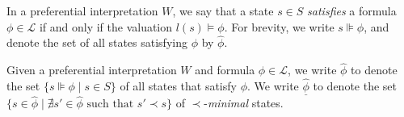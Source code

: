 \begin{definition}
  \label{definition:state-satisfaction} In a preferential interpretation $W$, we say that a state $s \in S$ \emph{satisfies} a formula $\phi
  \in \mathcal{L}$ if and only if the valuation $l(s) \vDash \phi$. For brevity, we write $s \VDash \phi$, and denote the set of all states
  satisfying $\phi$ by $\hat{\phi}$.
\end{definition}

\begin{definition}
  \label{definition:state-minimal} Given a preferential interpretation $W$ and formula $\phi \in \mathcal{L}$, we write $\hat{\phi}$ to
  denote the set $\{s \VDash \phi \mid s \in S\}$ of all states that satisfy $\phi$. We write $\underline{\hat{\phi}}$ to denote the set $\{s
  \in \hat{\phi}\mid \nexists s' \in \hat{\phi}\text{ such that }s' \prec s \}$ of $\prec$-\textit{minimal} states.
\end{definition}


